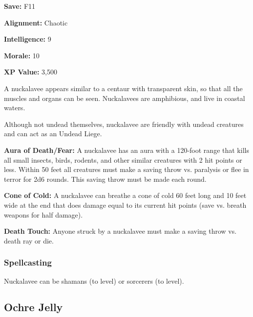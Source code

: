 \begin{multicols*}{2}
{\textbf{Save:} F11

\textbf{Alignment:} Chaotic

\textbf{Intelligence:} 9

\textbf{Morale:} 10

\textbf{XP Value:} 3,500}

A nuckalavee appears similar to a centaur with transparent skin, so that all the muscles and organs can be seen. Nuckalavees are amphibious, and live in coastal waters.

Although not undead themselves, nuckalavee are friendly with undead creatures and can act as an Undead Liege.

\textbf{Aura of Death/Fear:} A nuckalavee has an aura with a 120-foot range that kills all small insects, birds, rodents, and other similar creatures with 2 hit points or less. Within 50 feet all creatures must make a saving throw vs. paralysis or flee in terror for 2d6 rounds. This saving throw must be made each round.

\textbf{Cone of Cold:} A nuckalavee can breathe a cone of cold 60 feet long and 10 feet wide at the end that does damage equal to its current hit points (save vs. breath weapons for half damage).

\textbf{Death Touch:} Anyone struck by a nuckalavee must make a saving throw vs. death ray or die.

\subsubsection{Spellcasting}
Nuckalavee can be shamans (to  level) or sorcerers (to  level).

\subsection{Ochre Jelly}
\end{multicols*}
